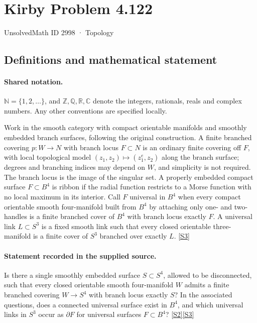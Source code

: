 \documentclass[11pt]{book}
\newcommand{\sref}[2]{\hyperlink{source:#1:#2}{[S#2]}}
\begin{document}
\setcounter{section}{2997}
\section{Kirby Problem 4.122}\label{2998}
{\small\sffamily UnsolvedMath ID 2998 · Topology}
\subsection{Definitions and mathematical statement}

\paragraph{Shared notation.}$\mathbb N=\{1,2,\ldots\}$, and $\mathbb Z,\mathbb Q,\mathbb R,\mathbb C$ denote the integers, rationals, reals and complex numbers. Any other conventions are specified locally.


Work in the smooth category with compact orientable manifolds and smoothly embedded branch surfaces, following the original construction. A finite branched covering $p:W\to N$ with branch locus $F\subset N$ is an ordinary finite covering off $F$, with local topological model $(z_1,z_2)\mapsto(z_1^e,z_2)$ along the branch surface; degrees and branching indices may depend on $W$, and simplicity is not required. The branch locus is the image of the singular set. A properly embedded compact surface $F\subset B^4$ is ribbon if the radial function restricts to a Morse function with no local maximum in its interior. Call $F$ universal in $B^4$ when every compact orientable smooth four-manifold built from $B^4$ by attaching only one- and two-handles is a finite branched cover of $B^4$ with branch locus exactly $F$. A universal link $L\subset S^3$ is a fixed smooth link such that every closed orientable three-manifold is a finite cover of $S^3$ branched over exactly $L$. \sref{2998}{3}
\paragraph{Statement recorded in the supplied source.}
Is there a single smoothly embedded surface $S\subset S^4$, allowed to be disconnected, such that every closed orientable smooth four-manifold $W$ admits a finite branched covering $W\to S^4$ with branch locus exactly $S$? In the associated questions, does a connected universal surface exist in $B^4$, and which universal links in $S^3$ occur as $\partial F$ for universal surfaces $F\subset B^4$? \sref{2998}{2}\sref{2998}{3}
\end{document}
